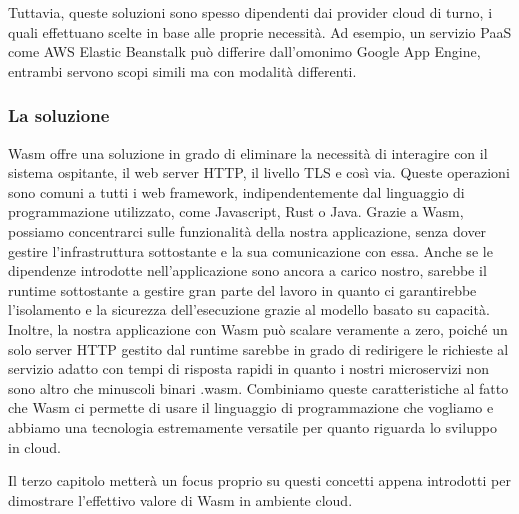 Tuttavia, queste soluzioni sono spesso dipendenti dai provider cloud di turno, i quali effettuano scelte in base alle
proprie necessità. Ad esempio, un servizio PaaS come AWS Elastic Beanstalk può differire dall'omonimo Google App Engine,
entrambi servono scopi simili ma con modalità differenti.

\subsubsection{La soluzione}
Wasm offre una soluzione in grado di eliminare la necessità di interagire con il sistema ospitante, il web server HTTP,
il livello TLS e così via. Queste operazioni sono comuni a tutti i web framework, indipendentemente dal linguaggio di
programmazione utilizzato, come Javascript, Rust o Java. Grazie a Wasm, possiamo concentrarci sulle funzionalità della
nostra applicazione, senza dover gestire l'infrastruttura sottostante e la sua comunicazione con essa. Anche se le
dipendenze introdotte nell'applicazione sono ancora a carico nostro, sarebbe il runtime sottostante a gestire gran parte
del lavoro in quanto ci garantirebbe l'isolamento e la sicurezza dell'esecuzione grazie al modello basato su capacità.
Inoltre, la nostra applicazione con Wasm può scalare veramente a zero, poiché un solo server HTTP gestito dal runtime
sarebbe in grado di redirigere le richieste al servizio adatto con tempi di risposta rapidi in quanto i nostri
microservizi non sono altro che minuscoli binari .wasm. Combiniamo queste caratteristiche al fatto che Wasm ci permette
di usare il linguaggio di programmazione che vogliamo e abbiamo una tecnologia estremamente versatile per quanto
riguarda lo sviluppo in cloud.

Il terzo capitolo metterà un focus proprio su questi concetti appena introdotti per dimostrare l'effettivo valore di
Wasm in ambiente cloud.